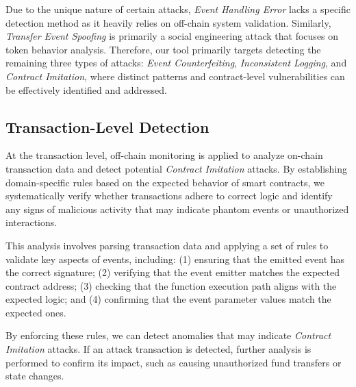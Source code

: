 Due to the unique nature of certain attacks, \emph{Event Handling Error} lacks a specific detection method as it heavily relies on off-chain system validation. Similarly, \emph{Transfer Event Spoofing} is primarily a social engineering attack that focuses on token behavior analysis. Therefore, our tool primarily targets detecting the remaining three types of attacks: \emph{Event Counterfeiting}, \emph{Inconsistent Logging}, and \emph{Contract Imitation}, where distinct patterns and contract-level vulnerabilities can be effectively identified and addressed.

\subsection{Transaction-Level Detection}
At the transaction level, off-chain monitoring is applied to analyze on-chain transaction data and detect potential \emph{Contract Imitation} attacks.
By establishing domain-specific rules based on the expected behavior of smart contracts, we systematically verify whether transactions adhere to correct logic and identify any signs of malicious activity that may indicate phantom events or unauthorized interactions.

This analysis involves parsing transaction data and applying a set of rules to validate key aspects of events, including:
(1) ensuring that the emitted event has the correct signature;
(2) verifying that the event emitter matches the expected contract address;
(3) checking that the function execution path aligns with the expected logic; and
(4) confirming that the event parameter values match the expected ones.

By enforcing these rules, we can detect anomalies that may indicate \emph{Contract Imitation} attacks.
If an attack transaction is detected, further analysis is performed to confirm its impact, such as causing unauthorized fund transfers or state changes.

\begin{table*}[t]
  \centering
  \caption{Transaction logs of the pNetwork attack.}
  \label{tab:pnetwork_transaction}
  \end{table*}

